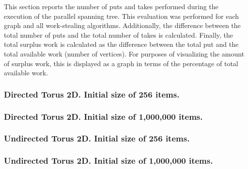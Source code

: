 This section reports the number of puts and takes performed during the
execution of the parallel spanning tree. This evaluation was performed
for each graph and all work-stealing algorithms. Additionally, the
difference between the total number of puts and the total number of
takes is calculated. Finally, the total surplus work is calculated as
the difference between the total put and the total available work
(number of vertices). For purposes of visualizing the amount of surplus
work, this is displayed as a graph in terms of the percentage of total
available work.

\subsubsection{Directed Torus 2D. Initial size of 256 items.}



\clearpage
\subsubsection{Directed Torus 2D. Initial size of 1,000,000 items.}



\clearpage
\subsubsection{Undirected Torus 2D. Initial size of 256 items.}



\clearpage
\subsubsection{Undirected Torus 2D. Initial size of 1,000,000 items.}




